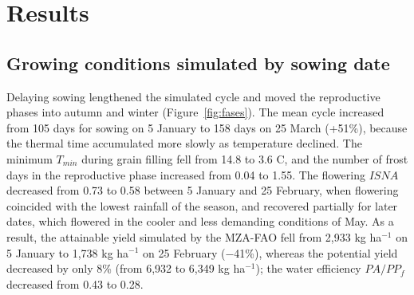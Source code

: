 \documentclass[10pt,a4paper]{article}
\begin{document}




\section{Results}
\label{sec:results}

\subsection{Growing conditions simulated by sowing date}
\label{subsec:res_sim}

Delaying sowing lengthened the simulated cycle and moved the reproductive phases into autumn and winter
(Figure~\ref{fig:fases}). The mean cycle increased from 105 days for sowing on 5 January to 158 days on
25 March (+51\%), because the thermal time accumulated more slowly as temperature declined. The minimum
$T_{min}$ during grain filling fell from 14.8 to 3.6 \textdegree{}C, and the number of frost days in the
reproductive phase increased from 0.04 to 1.55. The flowering $ISNA$ decreased from 0.73 to 0.58 between 5
January and 25 February, when flowering coincided with the lowest rainfall of the season, and recovered
partially for later dates, which flowered in the cooler and less demanding conditions of May. As a result,
the attainable yield simulated by the MZA-FAO fell from 2,933 kg ha$^{-1}$ on 5 January to 1,738 kg
ha$^{-1}$ on 25 February ($-$41\%), whereas the potential yield decreased by only 8\% (from 6,932 to
6,349 kg ha$^{-1}$); the water efficiency $PA/PP_f$ decreased from 0.43 to 0.28.
\end{document}
